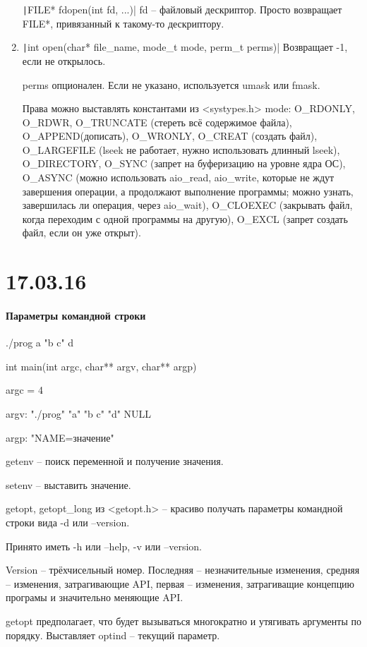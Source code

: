 \documentclass[a4paper,10pt]{article}
\newcommand{\ci}{\texttt}
\begin{document}
\begin{enumerate}
\ci|FILE* fdopen(int fd, ...)| fd -- файловый дескриптор. Просто возвращает FILE*, привязанный к такому-то дескриптору.
\item \ci|int open(char* file_name, mode_t mode, perm_t perms)|
Возвращает -1, если не открылось.

perms опционален. Если не указано, используется umask или fmask.

Права можно выставлять константами из <systypes.h>
mode: O\_RDONLY, O\_RDWR, O\_TRUNCATE (стереть всё содержимое файла), O\_APPEND(дописать), O\_WRONLY, O\_CREAT (создать файл), O\_LARGEFILE (lseek не работает, нужно использовать длинный lseek), O\_DIRECTORY, O\_SYNC (запрет на буферизацию на уровне ядра ОС), O\_ASYNC (можно использовать aio\_read, aio\_write, которые не ждут завершения операции, а продолжают выполнение программы; можно узнать, завершилась ли операция, через aio\_wait), O\_CLOEXEC (закрывать файл, когда переходим с одной программы на другую), O\_EXCL (запрет создать файл, если он уже открыт).

\end{enumerate}

\section{17.03.16}
\paragraph{Параметры командной строки}
./prog a "b c" d

int main(int argc, char** argv, char** argp)

argc = 4

argv: "./prog" "a" "b c" "d" NULL

argp: "NAME=значение"

getenv -- поиск переменной и получение значения.

setenv -- выставить значение.

getopt, getopt\_long из <getopt.h> -- красиво получать параметры командной строки вида -d или --version.

Принято иметь -h или --help, -v или --version.

Version -- трёхчисельный номер. Последняя -- незначительные изменения, средняя -- изменения, затрагивающие API, первая -- изменения, затрагиващие концепцию програмы и значительно меняющие API.

getopt предполагает, что будет вызываться многократно и утягивать аргументы по порядку. Выставляет optind -- текущий параметр.
\end{document}
